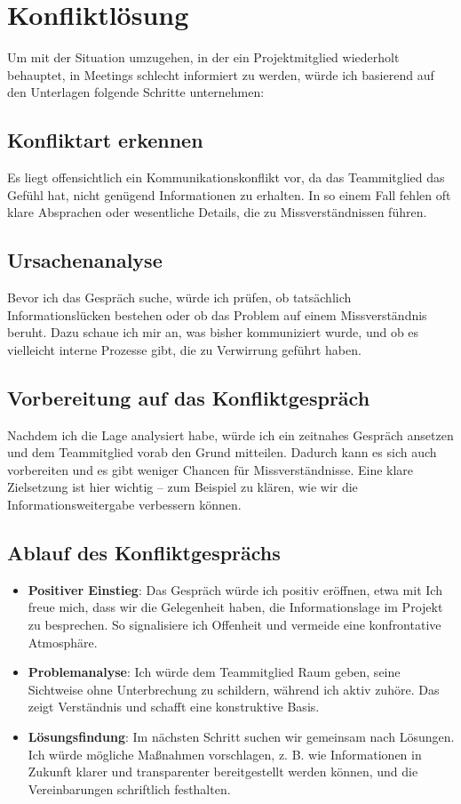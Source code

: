 \section{Konfliktlösung}
Um mit der Situation umzugehen, in der ein Projektmitglied wiederholt behauptet, in Meetings schlecht informiert zu werden, würde ich basierend auf den Unterlagen folgende Schritte unternehmen:

\subsection{Konfliktart erkennen}
Es liegt offensichtlich ein Kommunikationskonflikt vor, da das Teammitglied das Gefühl hat, nicht genügend Informationen zu erhalten. In so einem Fall fehlen oft klare Absprachen oder wesentliche Details, die zu Missverständnissen führen.

\subsection{Ursachenanalyse}
Bevor ich das Gespräch suche, würde ich prüfen, ob tatsächlich Informationslücken bestehen oder ob das Problem auf einem Missverständnis beruht. Dazu schaue ich mir an, was bisher kommuniziert wurde, und ob es vielleicht interne Prozesse gibt, die zu Verwirrung geführt haben.

\subsection{Vorbereitung auf das Konfliktgespräch}
Nachdem ich die Lage analysiert habe, würde ich ein zeitnahes Gespräch ansetzen und dem Teammitglied vorab den Grund mitteilen. Dadurch kann es sich auch vorbereiten und es gibt weniger Chancen für Missverständnisse. Eine klare Zielsetzung ist hier wichtig – zum Beispiel zu klären, wie wir die Informationsweitergabe verbessern können.

\subsection{Ablauf des Konfliktgesprächs}
\begin{itemize}
    \item \textbf{Positiver Einstieg}: Das Gespräch würde ich positiv eröffnen, etwa mit \glqq Ich freue mich, dass wir die Gelegenheit haben, die Informationslage im Projekt zu besprechen.\grqq{} So signalisiere ich Offenheit und vermeide eine konfrontative Atmosphäre.
    \item \textbf{Problemanalyse}: Ich würde dem Teammitglied Raum geben, seine Sichtweise ohne Unterbrechung zu schildern, während ich aktiv zuhöre. Das zeigt Verständnis und schafft eine konstruktive Basis.
    \item \textbf{Lösungsfindung}: Im nächsten Schritt suchen wir gemeinsam nach Lösungen. Ich würde mögliche Maßnahmen vorschlagen, z. B. wie Informationen in Zukunft klarer und transparenter bereitgestellt werden können, und die Vereinbarungen schriftlich festhalten.
\end{itemize}

